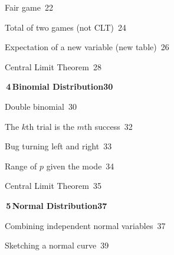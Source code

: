 \documentclass[a4paper,openany]{book}
\begin{document}
{\noindent{}\quad Fair game\dotfill\ 22\par
\noindent{}\quad Total of two games (not CLT)\dotfill\ 24\par
\noindent{}\quad Expectation of a new variable (new table)\dotfill\ 26\par
\noindent{}\quad Central Limit Theorem\dotfill\ 28\par
\medskip\noindent\colorbox{blue!8}{\parbox{\dimexpr\textwidth-2\fboxsep}{\large\bfseries\color{blue!50!black}\colorbox{blue!50!black}{\color{white}\,4\,}\quad Binomial Distribution\hfill 30}}\par\nopagebreak\smallskip\nopagebreak
\noindent{}\quad Double binomial\dotfill\ 30\par
\noindent{}\quad The $k$th trial is the $m$th success\dotfill\ 32\par
\noindent{}\quad Bug turning left and right\dotfill\ 33\par
\noindent{}\quad Range of $p$ given the mode\dotfill\ 34\par
\noindent{}\quad Central Limit Theorem\dotfill\ 35\par
\medskip\noindent\colorbox{blue!8}{\parbox{\dimexpr\textwidth-2\fboxsep}{\large\bfseries\color{blue!50!black}\colorbox{blue!50!black}{\color{white}\,5\,}\quad Normal Distribution\hfill 37}}\par\nopagebreak\smallskip\nopagebreak
\noindent{}\quad Combining independent normal variables\dotfill\ 37\par
\noindent{}\quad Sketching a normal curve\dotfill\ 39\par
}
\end{document}

